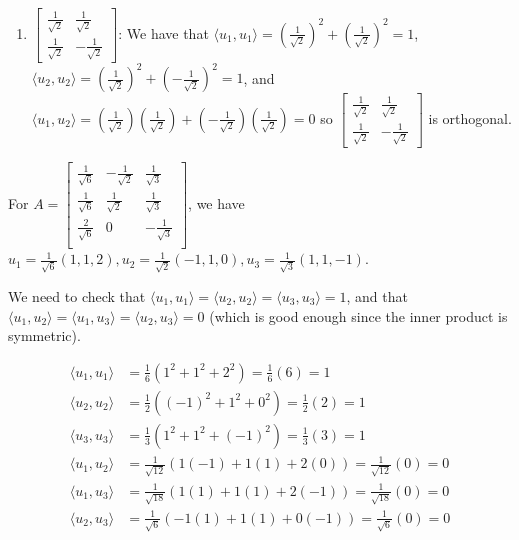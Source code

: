\documentclass[12pt,letterpaper]{article}
\theoremstyle{definition}
\begin{document}
\begin{enumerate}
  \item $\begin{bmatrix} \frac{1}{\sqrt{2}} & \frac{1}{\sqrt{2}} \\ \frac{1}{\sqrt{2}} & -\frac{1}{\sqrt{2}} \end{bmatrix}$: We have that $\langle u_1, u_1 \rangle = (\frac{1}{\sqrt{2}})^2 + (\frac{1}{\sqrt{2}})^2 = 1$, $\langle u_2, u_2 \rangle = (\frac{1}{\sqrt{2}})^2 + (-\frac{1}{\sqrt{2}})^2 = 1$, and $\langle u_1, u_2 \rangle = (\frac{1}{\sqrt{2}})(\frac{1}{\sqrt{2}}) + (-\frac{1}{\sqrt{2}})(\frac{1}{\sqrt{2}}) = 0$ so $\begin{bmatrix}  \frac{1}{\sqrt{2}} & \frac{1}{\sqrt{2}} \\ \frac{1}{\sqrt{2}} & -\frac{1}{\sqrt{2}} \end{bmatrix}$ is orthogonal.
\end{enumerate}

For $A = \begin{bmatrix} \frac{1}{\sqrt{6}} & -\frac{1}{\sqrt{2}} & \frac{1}{\sqrt{3}} \\ \frac{1}{\sqrt{6}} & \frac{1}{\sqrt{2}} & \frac{1}{\sqrt{3}} \\ \frac{2}{\sqrt{6}} & 0 & -\frac{1}{\sqrt{3}} \\ \end{bmatrix}$, we have $u_1 = \frac{1}{\sqrt{6}}(1, 1, 2), u_2 = \frac{1}{\sqrt{2}}(-1, 1, 0), u_3 = \frac{1}{\sqrt{3}}(1,1,-1)$.

We need to check that $\langle u_1, u_1 \rangle = \langle u_2, u_2 \rangle = \langle u_3, u_3 \rangle = 1$, and that $\langle u_1, u_2 \rangle = \langle u_1, u_3 \rangle = \langle u_2, u_3 \rangle = 0$ (which is good enough since the inner product is symmetric).

\begin{align*}
  \langle u_1, u_1 \rangle &= \frac{1}{6}(1^2 + 1^2 + 2^2) = \frac{1}{6}(6) = 1 \\
  \langle u_2, u_2 \rangle &= \frac{1}{2}((-1)^2 + 1^2 + 0^2) = \frac{1}{2}(2) = 1 \\
  \langle u_3, u_3 \rangle &= \frac{1}{3}(1^2 + 1^2 + (-1)^2) = \frac{1}{3}(3) = 1 \\
  \langle u_1, u_2 \rangle &= \frac{1}{\sqrt{12}}(1(-1) + 1(1) + 2(0)) = \frac{1}{\sqrt{12}}(0) = 0 \\
  \langle u_1, u_3 \rangle &= \frac{1}{\sqrt{18}}(1(1) + 1(1) + 2(-1)) = \frac{1}{\sqrt{18}}(0) = 0 \\
  \langle u_2, u_3 \rangle &= \frac{1}{\sqrt{6}}(-1(1) + 1(1) + 0(-1)) = \frac{1}{\sqrt{6}}(0) = 0 \\
\end{align*}
\end{document}
